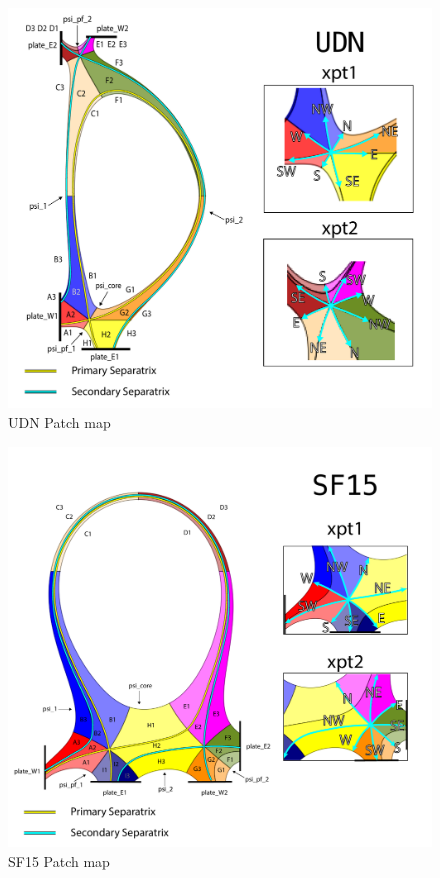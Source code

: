 \begin{figure}[H]
    \centering
        \includegraphics[width=\textwidth]{figures/configurations/UDN_collection.pdf}
        \caption{UDN Patch map}
        \label{fig:udn_patch_map}
\end{figure}
\begin{figure}[H]
    \centering
        \includegraphics[width=\textwidth]{figures/configurations/SF15_collection.pdf}
        \caption{SF15 Patch map}
        \label{fig:sf15_patch_map}
\end{figure}
